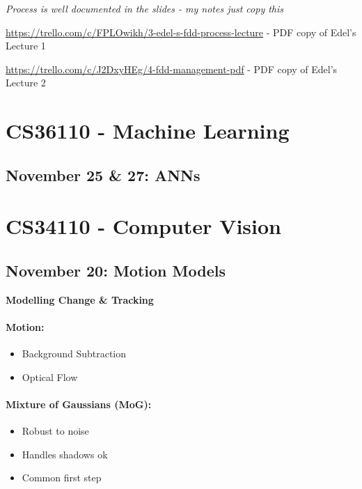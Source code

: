 \documentclass[paper=a4, fontsize=11pt]{article} %
\numberwithin{equation}{section} %
\numberwithin{figure}{section} %
\numberwithin{table}{section} %
\begin{document}
\textit{Process is well documented in the slides - my notes just copy this}

\url{https://trello.com/c/FPLOwikh/3-edel-s-fdd-process-lecture} - PDF copy of Edel's Lecture 1

\url{https://trello.com/c/J2DxyHEg/4-fdd-management-pdf} - PDF copy of Edel's Lecture 2



\section{CS36110 - Machine Learning}

\subsection{November 25 \& 27: ANNs}


\section{CS34110 - Computer Vision}

\subsection{November 20: Motion Models}

\textbf{Modelling Change \& Tracking}

\paragraph{Motion:}
\begin{itemize}
\item Background Subtraction
\item Optical Flow
\end{itemize}

\paragraph{Mixture of Gaussians (MoG):}
\begin{itemize}
\item Robust to noise
\item Handles shadows ok
\item Common first step
\end{itemize}
\end{document}
